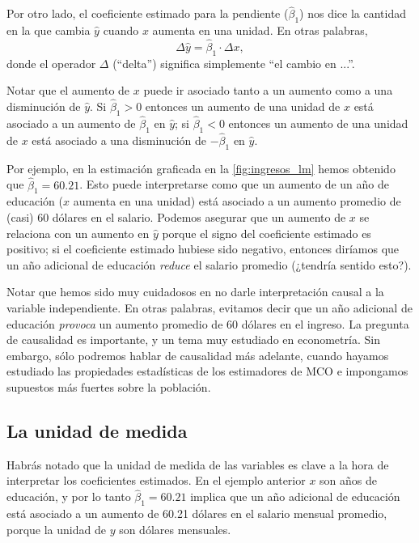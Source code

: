 \documentclass{report}\usepackage[]{graphicx}\usepackage[]{color}
\begin{document}
Por otro lado, el coeficiente estimado para la pendiente ($\hat\beta_1$) nos dice la cantidad en la que cambia $\hat y$ cuando $x$ aumenta en una unidad. En otras palabras,
\begin{equation}
\Delta \hat y = \hat \beta_1 \cdot \Delta x,
\end{equation}
donde el operador $\Delta$ (``delta'') significa simplemente ``el cambio en ...''.

Notar que el aumento de $x$ puede ir asociado tanto a un aumento como a una disminución de $\hat y$.
Si $\hat\beta_1 > 0$ entonces un aumento de una unidad de $x$ está asociado a un aumento de $\hat\beta_1$ en $\hat y$; si $\hat\beta_1 < 0$ entonces un aumento de una unidad de $x$ está asociado a una disminución de $-\hat\beta_1$ en $\hat y$.

Por ejemplo, en la estimación graficada en la \autoref{fig:ingresos_lm} hemos obtenido que $\hat\beta_1 = 60.21$.
Esto puede interpretarse como que un aumento de un año de educación ($x$ aumenta en una unidad) está asociado a un aumento promedio de (casi) 60 dólares en el salario.
Podemos asegurar que un aumento de $x$ se relaciona con un aumento en $\hat y$ porque el signo del coeficiente estimado es positivo; si el coeficiente estimado hubiese sido negativo, entonces diríamos que un año adicional de educación \emph{reduce} el salario promedio (¿tendría sentido esto?).

Notar que hemos sido muy cuidadosos en no darle interpretación causal a la variable independiente. En otras palabras, evitamos decir que un año adicional de educación \emph{provoca} un aumento promedio de 60 dólares en el ingreso. La pregunta de causalidad es importante, y un tema muy estudiado en econometría. Sin embargo, sólo podremos hablar de causalidad más adelante, cuando hayamos estudiado las propiedades estadísticas de los estimadores de MCO e impongamos supuestos más fuertes sobre la población.

\subsection{La unidad de medida}

Habrás notado que la unidad de medida de las variables es clave a la hora de interpretar los coeficientes estimados. En el ejemplo anterior $x$ son años de educación, y por lo tanto $\hat\beta_1 = 60.21$ implica que un año adicional de educación está asociado a un aumento de 60.21 dólares en el salario mensual promedio, porque la unidad de $y$ son dólares mensuales.
\end{document}
